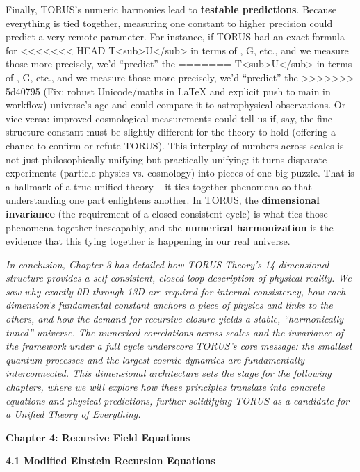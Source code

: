 \documentclass[]{article}
\begin{document}
Finally, TORUS's numeric harmonies lead to \textbf{testable
predictions}. Because everything is tied together, measuring one
constant to higher precision could predict a very remote parameter. For
instance, if TORUS had an exact formula for
<<<<<<< HEAD
T\textless sub\textgreater U\textless/sub\textgreater{} in terms of \alpha,
G, etc., and we measure those more precisely, we'd ``predict'' the
=======
T\textless{}sub\textgreater{}U\textless{}/sub\textgreater{} in terms of
\alpha, G, etc., and we measure those more precisely, we'd ``predict'' the
>>>>>>> 5d40795 (Fix: robust Unicode/maths in LaTeX and explicit push to main in workflow)
universe's age and could compare it to astrophysical observations. Or
vice versa: improved cosmological measurements could tell us if, say,
the fine-structure constant must be slightly different for the theory to
hold (offering a chance to confirm or refute TORUS). This interplay of
numbers across scales is not just philosophically unifying but
practically unifying: it turns disparate experiments (particle physics
vs. cosmology) into pieces of one big puzzle. That is a hallmark of a
true unified theory -- it ties together phenomena so that understanding
one part enlightens another. In TORUS, the \textbf{dimensional
invariance} (the requirement of a closed consistent cycle) is what ties
those phenomena together inescapably, and the \textbf{numerical
harmonization} is the evidence that this tying together is happening in
our real universe​.

\emph{In conclusion, Chapter 3 has detailed how TORUS Theory's
14-dimensional structure provides a self-consistent, closed-loop
description of physical reality. We saw why exactly 0D through 13D are
required for internal consistency, how each dimension's fundamental
constant anchors a piece of physics and links to the others, and how the
demand for recursive closure yields a stable, ``harmonically tuned''
universe. The numerical correlations across scales and the invariance of
the framework under a full cycle underscore TORUS's core message: the
smallest quantum processes and the largest cosmic dynamics are
fundamentally interconnected. This dimensional architecture sets the
stage for the following chapters, where we will explore how these
principles translate into concrete equations and physical predictions,
further solidifying TORUS as a candidate for a Unified Theory of
Everything.}

\textbf{Chapter 4: Recursive Field Equations}

\textbf{4.1 Modified Einstein Recursion Equations}
\end{document}
